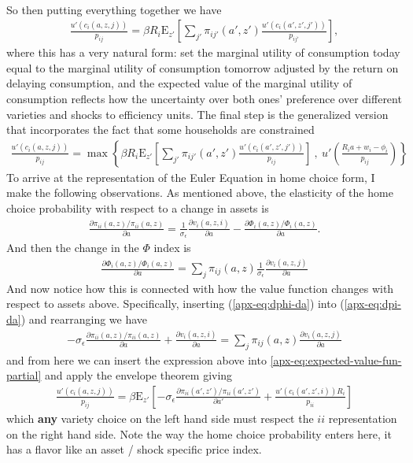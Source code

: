 \documentclass[12pt,pdftex]{article}
\begin{document}
\begin{onehalfspacing}
\begin{align}
\end{align}
So then putting everything together we have
\begin{align}
\frac{u'(c_{i}(a, z, j))}{p_{ij}} = \beta R_{i} \mathrm{E}_{z'} \left[ \sum_{j'} \pi_{ij'}(a', z') \frac{u'(c_{i}(a', z',j'))}{p_{ij'}} \right],
\label{apx-eq:euler}
\end{align}
where this has a very natural form: set the marginal utility of consumption today equal to the marginal utility of consumption tomorrow adjusted by the return on delaying consumption, and the expected value of the marginal utility of consumption reflects how the uncertainty over both ones' preference over different varieties and shocks to efficiency units. The final step is the generalized version that incorporates the fact that some households are constrained
\begin{align}
\frac{u'(c_{i}(a, z, j))}{p_{ij}} = \max \left\{ \beta R_{i} \mathrm{E}_{z'} \left[ \sum_{j'} \pi_{ij'}(a', z') \frac{u'(c_{i}(a', z', j'))}{p_{ij}} \right] \ , \  u' \left( \frac{R_i a + w_i - \phi_{i}}{p_{ij}} \right) \right \}
\label{eq:apx-euler-equation}
\end{align}
To arrive at the representation of the Euler Equation in home choice form, I make the following observations. As mentioned above, the elasticity of the home choice probability with respect to a change in assets is
\begin{align}
\frac{\partial \pi_{ii}(a,z) / \pi_{ii}(a,z) }{\partial a} = \frac{1}{\sigma_{\epsilon}}\frac{\partial v_{i}(a,z,i)}{\partial a} - \frac{\partial \Phi_{i}(a,z) / \Phi_{i}(a,z)}{\partial a}.
\label{apx-eq:dpi-da}
\end{align}
And then the change in the $\Phi$ index is
\begin{align}
\frac{\partial \Phi_{i}(a,z) / \Phi_{i}(a,z)}{\partial a} = \sum_{j} \pi_{ij}(a,z) \frac{1}{\sigma_{\epsilon}}\frac{\partial v_{i}(a,z,j)}{\partial a}
\label{apx-eq:dphi-da}
\end{align}
And now notice how this is connected with how the value function changes with respect to assets above. Specifically, inserting (\ref{apx-eq:dphi-da}) into (\ref{apx-eq:dpi-da}) and rearranging we have
\begin{align}
-\sigma_{\epsilon} \frac{\partial \pi_{ii}(a,z) / \pi_{ii}(a,z) }{\partial a} + \frac{\partial v_{i}(a,z,i)}{\partial a} =
\sum_{j} \pi_{ij}(a,z) \frac{\partial v_{i}(a,z,j)}{\partial a}
\end{align}
and from here we can insert the expression above into \ref{apx-eq:expected-value-fun-partial} and apply the envelope theorem giving
\begin{align}
\frac{u'(c_{i}(a, z, j))}{p_{ij}} = \beta \mathrm{E}_{z'} \left[ -\sigma_{\epsilon} \frac{\partial \pi_{ii}(a',z') / \pi_{ii}(a',z')}{\partial a'} + \frac{u'(c_{i}(a', z', i))R_i}{p_{ii}} \right]
\label{apx-eq:homechoice-euler}
\end{align}
which \textbf{any} variety choice on the left hand side must respect the $ii$ representation on the right hand side. Note the way the home choice probability enters here, it has a flavor like an asset / shock specific price index.


\end{onehalfspacing}
\end{document}

